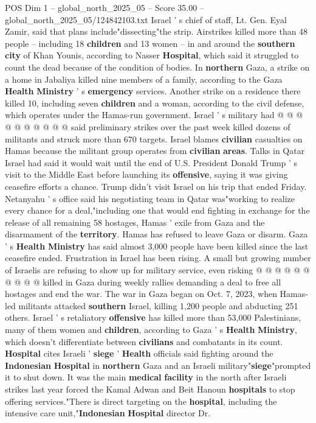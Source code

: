 \begin{textsample}{POS Dim 1 – global\_north\_2025\_05 – Score 35.00 – global\_north\_2025\_05/124842103.txt}
Israel ' s chief of staff, Lt.
Gen.
Eyal Zamir, said that plans include"dissecting"the strip.
Airstrikes killed more than 48 people -- including 18 \textbf{children} and 13 women -- in and around the \textbf{southern} \textbf{city} of Khan Younis, according to Nasser \textbf{Hospital}, which said it struggled to count the dead because of the condition of bodies.
In \textbf{northern} Gaza, a strike on a home in Jabaliya killed nine members of a family, according to the Gaza \textbf{Health} \textbf{Ministry} ' s \textbf{emergency} services.
Another strike on a residence there killed 10, including seven \textbf{children} and a woman, according to the civil defense, which operates under the Hamas-run government.
Israel ' s military had @ @ @ @ @ @ @ @ @ @ said preliminary strikes over the past week killed dozens of militants and struck more than 670 targets.
Israel blames \textbf{civilian} casualties on Hamas because the militant group operates from \textbf{civilian} \textbf{areas}.
Talks in Qatar Israel had said it would wait until the end of U.S.
President Donald Trump ' s visit to the Middle East before launching its \textbf{offensive}, saying it was giving ceasefire efforts a chance.
Trump didn't visit Israel on his trip that ended Friday.
Netanyahu ' s office said his negotiating team in Qatar was"working to realize every chance for a deal,"including one that would end fighting in exchange for the release of all remaining 58 hostages, Hamas ' exile from Gaza and the disarmament of the \textbf{territory}.
Hamas has refused to leave Gaza or disarm.
Gaza ' s \textbf{Health} \textbf{Ministry} has said almost 3,000 people have been killed since the last ceasefire ended.
Frustration in Israel has been rising.
A small but growing number of Israelis are refusing to show up for military service, even risking @ @ @ @ @ @ @ @ @ @ killed in Gaza during weekly rallies demanding a deal to free all hostages and end the war.
The war in Gaza began on Oct. 7, 2023, when Hamas-led militants attacked \textbf{southern} Israel, killing 1,200 people and abducting 251 others.
Israel ' s retaliatory \textbf{offensive} has killed more than 53,000 Palestinians, many of them women and \textbf{children}, according to Gaza ' s \textbf{Health} \textbf{Ministry}, which doesn't differentiate between \textbf{civilians} and combatants in its count. \textbf{Hospital} cites Israeli ' \textbf{siege} ' \textbf{Health} officials said fighting around the \textbf{Indonesian} \textbf{Hospital} in \textbf{northern} Gaza and an Israeli military"\textbf{siege}"prompted it to shut down.
It was the main \textbf{medical} \textbf{facility} in the north after Israeli strikes last year forced the Kamal Adwan and Beit Hanoun \textbf{hospitals} to stop offering services."There is direct targeting on the \textbf{hospital}, including the intensive care unit,"\textbf{Indonesian} \textbf{Hospital} director Dr.

\end{textsample}
